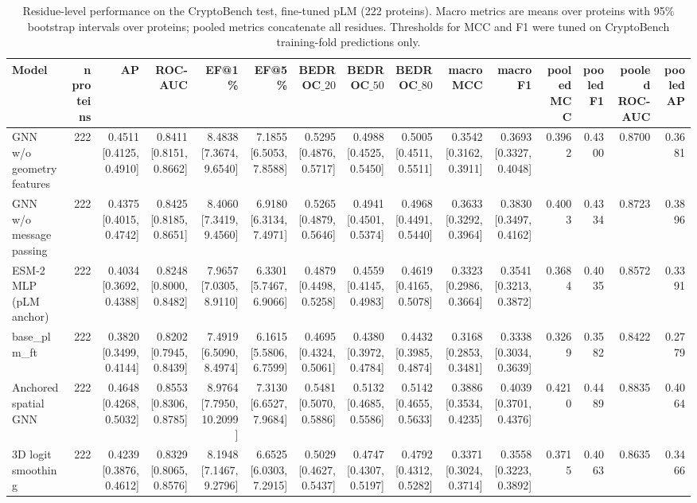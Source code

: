 \begin{table}[t]
\centering
\small
\caption{Residue-level performance on the CryptoBench test, fine-tuned pLM (222 proteins). Macro metrics are means over proteins with 95\% bootstrap intervals over proteins; pooled metrics concatenate all residues. Thresholds for MCC and F1 were tuned on CryptoBench training-fold predictions only.}
\label{tab:table_absolute}
\begin{tabular}{lrrrrrrrrrrrrrr}
\toprule
Model & n proteins & AP & ROC-AUC & EF@1\% & EF@5\% & BEDROC$\_{20}$ & BEDROC$\_{50}$ & BEDROC$\_{80}$ & macro MCC & macro F1 & pooled MCC & pooled F1 & pooled ROC-AUC & pooled AP \\
\midrule
GNN w/o geometry features & 222 & 0.4511 [0.4125, 0.4910] & 0.8411 [0.8151, 0.8662] & 8.4838 [7.3674, 9.6540] & 7.1855 [6.5053, 7.8588] & 0.5295 [0.4876, 0.5717] & 0.4988 [0.4525, 0.5450] & 0.5005 [0.4511, 0.5511] & 0.3542 [0.3162, 0.3911] & 0.3693 [0.3327, 0.4048] & 0.3962 & 0.4300 & 0.8700 & 0.3681 \\
GNN w/o message passing & 222 & 0.4375 [0.4015, 0.4742] & 0.8425 [0.8185, 0.8651] & 8.4060 [7.3419, 9.4560] & 6.9180 [6.3134, 7.4971] & 0.5265 [0.4879, 0.5646] & 0.4941 [0.4501, 0.5374] & 0.4968 [0.4491, 0.5440] & 0.3633 [0.3292, 0.3964] & 0.3830 [0.3497, 0.4162] & 0.4003 & 0.4334 & 0.8723 & 0.3896 \\
ESM-2 MLP (pLM anchor) & 222 & 0.4034 [0.3692, 0.4388] & 0.8248 [0.8000, 0.8482] & 7.9657 [7.0305, 8.9110] & 6.3301 [5.7467, 6.9066] & 0.4879 [0.4498, 0.5258] & 0.4559 [0.4145, 0.4983] & 0.4619 [0.4165, 0.5078] & 0.3323 [0.2986, 0.3664] & 0.3541 [0.3213, 0.3872] & 0.3684 & 0.4035 & 0.8572 & 0.3391 \\
base\_plm\_ft & 222 & 0.3820 [0.3499, 0.4144] & 0.8202 [0.7945, 0.8439] & 7.4919 [6.5090, 8.4974] & 6.1615 [5.5806, 6.7599] & 0.4695 [0.4324, 0.5061] & 0.4380 [0.3972, 0.4784] & 0.4432 [0.3985, 0.4874] & 0.3168 [0.2853, 0.3481] & 0.3338 [0.3034, 0.3639] & 0.3269 & 0.3582 & 0.8422 & 0.2779 \\
Anchored spatial GNN & 222 & 0.4648 [0.4268, 0.5032] & 0.8553 [0.8306, 0.8785] & 8.9764 [7.7950, 10.2099] & 7.3130 [6.6527, 7.9684] & 0.5481 [0.5070, 0.5886] & 0.5132 [0.4685, 0.5586] & 0.5142 [0.4655, 0.5633] & 0.3886 [0.3534, 0.4235] & 0.4039 [0.3701, 0.4376] & 0.4210 & 0.4489 & 0.8835 & 0.4064 \\
3D logit smoothing & 222 & 0.4239 [0.3876, 0.4612] & 0.8329 [0.8065, 0.8576] & 8.1948 [7.1467, 9.2796] & 6.6525 [6.0303, 7.2915] & 0.5029 [0.4627, 0.5437] & 0.4747 [0.4307, 0.5197] & 0.4792 [0.4312, 0.5282] & 0.3371 [0.3024, 0.3714] & 0.3558 [0.3223, 0.3892] & 0.3715 & 0.4063 & 0.8635 & 0.3466 \\
\bottomrule
\end{tabular}
\end{table}
